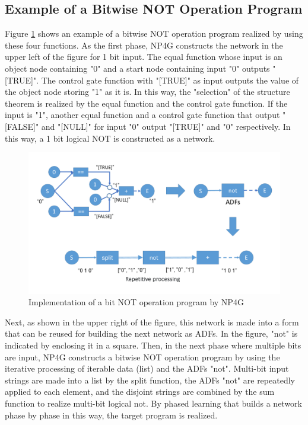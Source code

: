 \documentclass{article}
\begin{document}
\subsection {Example of a Bitwise NOT Operation Program}
Figure \ref{fig:bitwise_not} shows an example of a bitwise NOT operation program realized by using these four functions.
As the first phase, NP4G constructs the network in the upper left of the figure for 1 bit input.
The equal function whose input is an object node containing "0" and a start node containing input "0" outputs "[TRUE]".
The control gate function with "[TRUE]" as input outputs the value of the object node storing "1" as it is.
In this way, the "selection" of the structure theorem is realized by the equal function and the control gate function.
If the input is "1", another equal function and a control gate function that output "[FALSE]" and "[NULL]" for input "0" output "[TRUE]" and "0" respectively.
In this way, a 1 bit logical NOT is constructed as a network.

\begin{figure}[t]
    \begin{center}
        \includegraphics[width=150mm]{bitwise_not.png}
    \end{center}
    \caption{Implementation of a bit NOT operation program by NP4G}
    \label{fig:bitwise_not}
\end{figure}

Next, as shown in the upper right of the figure, this network is made into a form that can be reused for building the next network as ADFs.
In the figure, "not" is indicated by enclosing it in a square.
Then, in the next phase where multiple bits are input, NP4G constructs a bitwise NOT operation program by using the iterative processing of iterable data (list) and the ADFs "not".
Multi-bit input strings are made into a list by the split function, the ADFs "not" are repeatedly applied to each element, and the disjoint strings are combined by the sum function to realize multi-bit logical not.
By phased learning that builds a network phase by phase in this way, the target program is realized.
\end{document}

